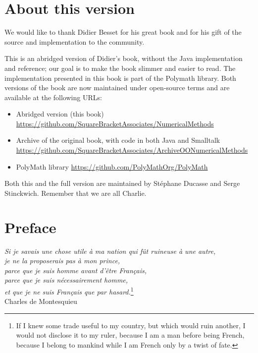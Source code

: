\documentclass[twoside]{book}
\begin{document}
\fi


\chapter*{About this version}
We would like to thank Didier Besset for his great book and for his gift of the source and implementation to the community. 

This is an abridged version of Didier's book, without the Java implementation and reference; our goal is to make the book slimmer and easier to read.
The implementation presented in this book is part of the Polymath library.
Both versions of the book are now maintained under open-source terms and are available at the following URLs:

\begin{itemize}
\item Abridged version (this book)\\
  \url{https://github.com/SquareBracketAssociates/NumericalMethods}
\item Archive of the original book, with code in both Java and Smalltalk\\
  \url{https://github.com/SquareBracketAssociates/ArchiveOONumericalMethods}
\item PolyMath library
  \url{https://github.com/PolyMathOrg/PolyMath}
\end{itemize}

Both this and the full version are maintained by St\'ephane Ducasse and Serge Stinckwich.
Remember that we are all Charlie.

\bigskip
{}

\chapter*{Preface}

\begin{flushright} {\sl Si je savais une chose
utile \`{a} ma nation qui f\^{u}t ruineuse \`{a} une autre,\\je ne
la proposerais pas \`{a} mon prince,\\parce que je suis homme
avant d'\^etre Fran\c cais,\\parce que je suis n\'ecessairement
homme,\\et que je ne suis Fran\c cais que par hasard.}\footnote{If I
knew some trade useful to my country, but which would ruin
another, I would not disclose it to my ruler, because I am a man
before being French, because I belong to mankind while I am French
only by a twist of fate.}\\ Charles de Montesquieu
\end{flushright}
\end{document}
